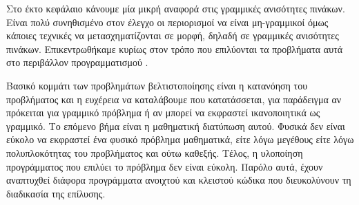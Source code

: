 Στο έκτο κεφάλαιο κάνουμε μία μικρή αναφορά στις γραμμικές ανισότητες
πινάκων. Είναι πολύ συνηθισμένο στον έλεγχο οι περιορισμοί να είναι μη-γραμμικοί
όμως κάποιες τεχνικές να μετασχηματίζονται σε  μορφή, δηλαδή σε
γραμμικές ανισότητες πινάκων. Επικεντρωθήκαμε κυρίως στον τρόπο που επιλύονται
τα προβλήματα αυτά στο περιβάλλον προγραμματισμού .

Βασικό κομμάτι των προβλημάτων βελτιστοποίησης είναι η κατανόηση του προβλήματος
και η ευχέρεια να καταλάβουμε που κατατάσσεται, για παράδειγμα αν πρόκειται για
γραμμικό πρόβλημα ή αν μπορεί να εκφραστεί ικανοποιητικά ως γραμμικό. Το επόμενο
βήμα είναι η μαθηματική διατύπωση αυτού. Φυσικά δεν είναι εύκολο να εκφραστεί
ένα φυσικό πρόβλημα μαθηματικά, είτε λόγω μεγέθους είτε λόγω πολυπλοκότητας του
προβλήματος και ούτω καθεξής. Τέλος, η υλοποίηση προγράμματος που επιλύει το
πρόβλημα δεν είναι εύκολη. Παρόλο αυτά, έχουν αναπτυχθεί διάφορα προγράμματα
ανοιχτού και κλειστού κώδικα που διευκολύνουν τη διαδικασία της επίλυσης.
